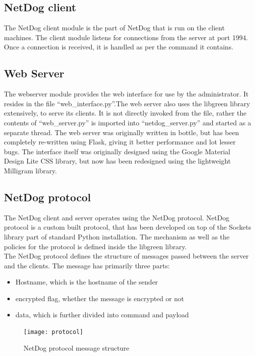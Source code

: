 \subsection{NetDog client}
The NetDog client module is the part of NetDog that is run on the client
machines. The client module listens for connections from the server at port
1994. Once a connection is received, it is handled as per the command it
contains.

\subsection{Web Server}
The webserver module provides the web interface for use by the administrator.
It resides in the file ``web\_interface.py''.The web server also uses the
libgreen library extensively, to serve its clients. It is not directly invoked
from the file, rather the contents of ``web\_server.py'' is imported into
``netdog\_server.py'' and started as a separate thread. The web server was
originally written in bottle, but has been completely re-written using Flask,
giving it better performance and lot lesser bugs. The interface itself was
originally designed using the Google Material Design Lite CSS library, but now
has been redesigned using the lightweight Milligram library.

\subsection{NetDog protocol}
The NetDog client and server operates using the NetDog protocol. NetDog protocol
is a custom built protocol, that has been developed on top of the Sockets
library part of standard Python installation. The mechanism as well as the
policies for the protocol is defined inside the libgreen library.\\

The NetDog protocol defines the structure of messages passed between the server
and the clients. The message has primarily three parts:

\begin{itemize}
    \item Hostname, which is the hostname of the sender
    \item encrypted flag, whether the message is encrypted or not
    \item data, which is further divided into command and payload
\end{itemize}

\begin{figure}[H]
\centering
\texttt{[image: protocol]}
\caption{NetDog protocol message structure}
\end{figure}


